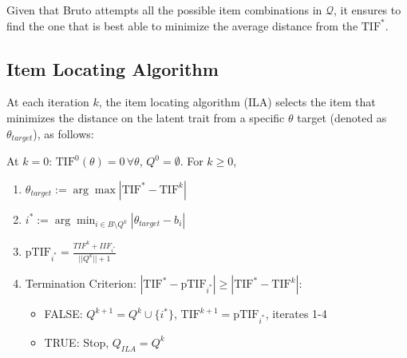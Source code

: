 \documentclass[12pt, a4paper, titilepage]{article}
\begin{document}
Given that Bruto attempts all the possible item combinations in $\mathcal{Q}$, it ensures to find the one that is best able to minimize the average distance from the $\text{TIF}^*$.

\subsection*{Item Locating Algorithm}


At each iteration $k$, the item locating algorithm (ILA) selects the item that minimizes the distance on the latent trait from a specific $\theta$ target (denoted as $\theta_{target}$), as follows:


At $k = 0$: $\text{TIF}^0(\theta) = 0 \, \forall \theta$, $Q^0 = \emptyset$. For $k \geq 0$,
\begin{enumerate}
	\item $\theta_{target} := \arg \max |\text{TIF}^* - \text{TIF}^{k}|$
	\item $i^* := \arg \min_{i \in B\setminus Q^{k}} |\theta_{target} - b_i|$
	\item $\text{pTIF}_{i^*} = \frac{TIF^k + IIF_{i^*}}{||Q^{k}|| + 1}$ %
	\item Termination Criterion: $|\text{TIF}^* - \text{pTIF}_{i^*}| \geq |\text{TIF}^* - \text{TIF}^{k}|$: 
	\begin{itemize}
		\item FALSE:  $Q^{k+1} = Q^{k} \cup \{i^*\}$, $\text{TIF}^{k+1} = \text{pTIF}_{i^*}$, iterates 1-4 
		\item TRUE: Stop, %
		$Q_{ILA} = Q^k$
	\end{itemize}
\end{enumerate}
\end{document}
